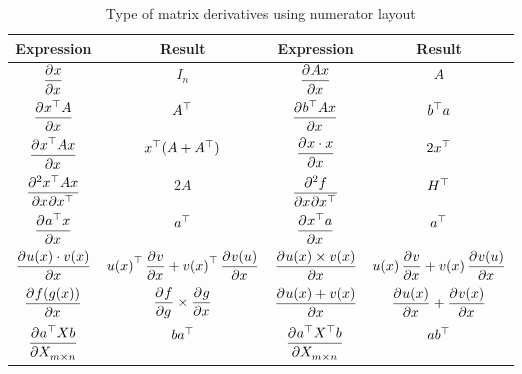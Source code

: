 \begin{table}[ht]
\centering
\renewcommand*{\arraystretch}{2.5}
\begin{tabular}[t]{|c|c|c|c|}
\hline
Expression & Result & Expression & Result \\ \hline
$\dpd{{x}}{{x}}$ & $I_n$ & $\dpd{A {x}}{{x}}$ & $A$\\[1ex] \hline
$\dpd{\transpose{{x}}A}{{x}}$ & ${A}^\top$ & $\dpd{\transpose{b}A {x}}{{x}}$ & ${b}^\top a$ \\[1ex]  \hline
$\dpd{\transpose{{x}}A {x}}{{x}}$ & $ {{x}}^\top(A + {A}^\top)$ & $\dpd{x \cdot x}{{x}}$ & $ 2{{x}}^\top$ \\[1ex]  \hline
$\dmd{{\transpose{{x}}A {x}}}{2}{{x}}{}{{\transpose{{x}}}}{}$ & $2A$ & $\dmd{f}{2}{{x}}{}{{\transpose{{x}}}}{}$ & ${H}^\top$  \\[1ex]  \hline
$\dpd{\transpose{a}x}{x}$ & ${a}^\top$ & $\dpd{\transpose{x}a}{x}$ & ${a}^\top$  \\[1ex]  \hline
$\dpd{u(x) \cdot v(x)}{x}$ & $\transpose{u(x)} \dpd{v}{x} + \transpose{v(x)} \dpd{v(u)}{x}$ & $\dpd{u(x) \times v(x)}{x}$ & $u(x) \dpd{v}{x} + v(x) \dpd{v(u)}{x}$  \\[1ex]  \hline
$\dpd{f(g(x))}{x}$ & $\dpd{f}{g} \times \dpd{g}{x}$ & $\dpd{u(x) + v(x)}{x}$ & $\dpd{u(x)}{x} + \dpd{v(x)}{x}$ \\[1ex]  \hline
$\dpd{\transpose{a}X b}{X_{m \times n}}$ & $b {a}^\top$ & $\dpd{\transpose{a} \transpose{X} b}{X_{m \times n}}$ & $a {b}^\top$ \\[1ex]  \hline
\end{tabular}

\caption{Type of matrix derivatives using numerator layout}
\end{table}





























